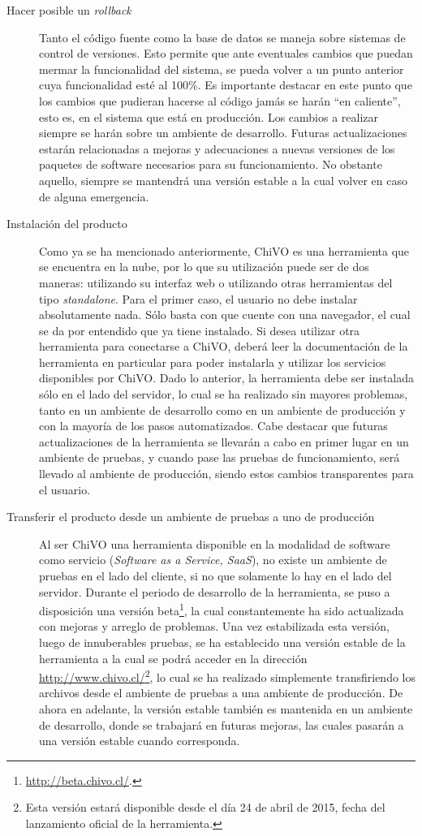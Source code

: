 \begin{description}
\begin{description}
			\item [Hacer posible un \emph{rollback}] Tanto el código fuente como la base de datos se maneja sobre sistemas de control de versiones. Esto permite que ante eventuales cambios que puedan mermar la funcionalidad del sistema, se pueda volver a un punto anterior cuya funcionalidad est\'e al 100\%. Es importante destacar en este punto que los cambios que pudieran hacerse al código jamás se harán ``en caliente'', esto es, en el sistema que está en producción. Los cambios a realizar siempre se harán sobre un ambiente de desarrollo. Futuras actualizaciones estarán relacionadas a mejoras y adecuaciones a nuevas versiones de los paquetes de software necesarios para su funcionamiento. No obstante aquello, siempre se mantendrá una versión estable a la cual volver en caso de alguna emergencia.
			\item [Instalación del producto] Como ya se ha mencionado anteriormente, ChiVO es una herramienta que se encuentra en la nube, por lo que su utilización puede ser de dos maneras: utilizando su interfaz web o utilizando otras herramientas del tipo \emph{standalone}. Para el primer caso, el usuario no debe instalar absolutamente nada. Sólo basta con que cuente con una navegador, el cual se da por entendido que ya tiene instalado. Si desea utilizar otra herramienta para conectarse a ChiVO, deberá leer la documentación de la herramienta en particular para poder instalarla y utilizar los servicios disponibles por ChiVO. Dado lo anterior, la herramienta debe ser instalada sólo en el lado del servidor, lo cual se ha realizado sin mayores problemas, tanto en un ambiente de desarrollo como en un ambiente de producción y con la mayoría de los pasos automatizados. Cabe destacar que futuras actualizaciones de la herramienta se llevarán a cabo en primer lugar en un ambiente de pruebas, y cuando pase las pruebas de funcionamiento, será llevado al ambiente de producción, siendo estos cambios transparentes para el usuario.
			\item [Transferir el producto desde un ambiente de pruebas a uno de producción] Al ser ChiVO una herramienta disponible en la modalidad de software como servicio (\emph{Software as a Service, SaaS}), no existe un ambiente de pruebas en el lado del cliente, si no que solamente lo hay en el lado del servidor. Durante el periodo de desarrollo de la herramienta, se puso a disposición una versión beta\footnote{\url{http://beta.chivo.cl/}.}, la cual constantemente ha sido actualizada con mejoras y arreglo de problemas. Una vez estabilizada esta versión, luego de innuberables pruebas, se ha establecido una versión estable de la herramienta a la cual se podrá acceder en la dirección \url{http://www.chivo.cl/}\footnote{Esta versión estará disponible desde el día 24 de abril de 2015, fecha del lanzamiento oficial de la herramienta.}, lo cual se ha realizado simplemente transfiriendo los archivos desde el ambiente de pruebas a una ambiente de producción. De ahora en adelante, la versión estable tambi\'en es mantenida en un ambiente de desarrollo, donde se trabajará en futuras mejoras, las cuales pasarán a una versión estable cuando corresponda.

\end{description}
\end{description}
